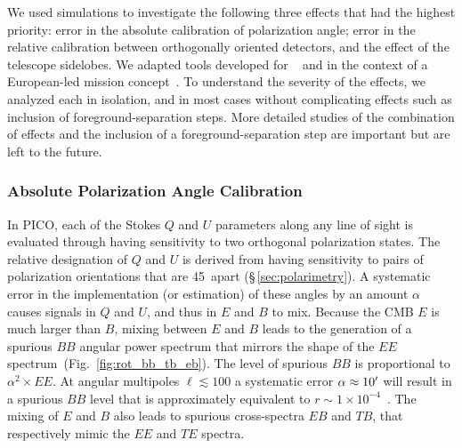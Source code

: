 \documentclass[PICOReport.tex]{subfiles}
\begin{document}
We used simulations to investigate the following three effects that had the highest priority: error in the absolute calibration of polarization angle; error in the relative calibration between orthogonally oriented detectors, and the effect of the telescope sidelobes. We adapted tools developed for \planck~\cite{plank2015_xii_focalplane} and in the context of a European-led mission concept~\citep{core_systematics}. To understand the severity of the effects, we analyzed each in isolation, and in most cases without complicating effects such as inclusion of foreground-separation steps. More detailed studies of the combination of effects and the inclusion of a foreground-separation step are important but are left to the future. 


%



\subsubsection{Absolute Polarization Angle Calibration}
\label{sec:angle}

In PICO, each of the Stokes $Q$ and $U$ parameters along any line of sight is evaluated through having sensitivity to two orthogonal polarization states. The relative designation of $Q$ and $U$ is derived from having sensitivity to pairs of polarization orientations that are 45\degree\ apart (\S\,\ref{sec:polarimetry}). A systematic error in the implementation (or estimation) of these angles by an amount $\alpha$ causes signals in $Q$ and $U$, and thus in $E$ and $B$ to mix. Because the CMB $E$ is much larger than $B$, mixing between $E$ and $B$ leads to the generation of a spurious $BB$ angular power spectrum that mirrors the shape of the $EE$ spectrum~(Fig.~\ref{fig:rot_bb_tb_eb}). The level of spurious $BB$ is proportional to $\alpha^{2} \times EE$. At angular multipoles $\ell \lesssim 100$ a systematic error $\alpha\approx 10'$ will result in a spurious $BB$ level that is approximately equivalent to $r \sim 1\times10^{-4}$~\citep{shimon2008,Aumont+2018}.  The mixing of $E$ and $B$ also leads to spurious cross-spectra $EB$ and $TB$, that respectively mimic the $EE$ and $TE$ spectra. 
\end{document}
